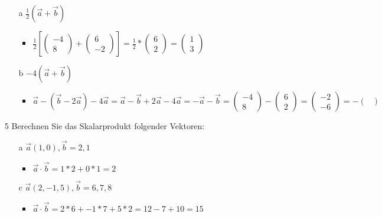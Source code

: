 \documentclass{article}
\begin{document}
\begin{itemize}
		\begin{itemize}
			\item[a]{$\frac{1}{2}(\vec{a}+\vec{b})$}
			\begin{itemize}
				\item{$\frac{1}{2}[\begin{pmatrix} -4 \\ 8 \end{pmatrix}+\begin{pmatrix} 6 \\ -2 \end{pmatrix}]=\frac{1}{2}*\begin{pmatrix} 6 \\ 2 \end{pmatrix}=\begin{pmatrix} 1 \\ 3 \end{pmatrix}$}
			\end{itemize}
			\item[b]{$-4(\vec{a}+\vec{b})$}
			\begin{itemize}
				\item{$\vec{a}-(\vec{b}-2 \vec{a}) -4 \vec{a}=\vec{a}-\vec{b}+2 \vec{a}-4 \vec{a}=-\vec{a}-\vec{b}=\begin{pmatrix} -4 \\ 8 \end{pmatrix}-\begin{pmatrix} 6 \\ 2 \end{pmatrix}=\begin{pmatrix} -2 \\ -6 \end{pmatrix}=-\begin{pmatrix}  \\  \end{pmatrix}$}
			\end{itemize}
		\end{itemize}
		\item[5]{Berechnen Sie das Skalarprodukt folgender Vektoren:}
		\begin{itemize}
			\item[a]{$\vec{a}(1,0), \vec{b}=2,1$}
			\begin{itemize}
				\item{$\vec{a}\cdot\vec{b}=1*2 + 0*1=2$}
			\end{itemize}
			\item[c]{$\vec{a}(2, -1, 5), \vec{b}=6,7,8$}
			\begin{itemize}
				\item{$\vec{a}\cdot\vec{b}=2*6+-1*7+5*2=12-7+10=15$}

\end{itemize}
\end{itemize}
\end{itemize}
\end{document}
